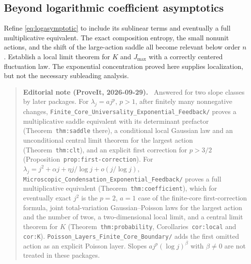 \documentclass[11pt,a4paper]{article}
\numberwithin{equation}{section}
\theoremstyle{definition}
\theoremstyle{remark}
\newenvironment{ednote}{\par\smallskip\begin{quote}\small\raggedright\textbf{Editorial note (ProveIt, 2026-09-29).}\ }{\end{quote}\smallskip}
\begin{document}
\subsection{Beyond logarithmic coefficient asymptotics}
Refine \eqref{eq:logasymptotic} to include its sublinear terms and eventually
a full multiplicative equivalent.  The exact composition entropy, the
small nonunit actions, and the shift of the large-action saddle all become
relevant below order $n$.  Establish a local limit theorem for $K$ and
$J_{\max}$ with a correctly centered fluctuation law.  The exponential
concentration proved here supplies localization, but not the necessary
subleading analysis.
\begin{ednote}
Answered for two slope classes by later packages. For $\lambda_j=aj^p$,
$p>1$, after finitely many nonnegative changes,
\nolinkurl{Finite_Core_Universality_Exponential_Feedback/} proves a
multiplicative saddle equivalent with its determinant prefactor
(Theorem~\texttt{thm:saddle} there), a conditional local Gaussian law and an
unconditional central limit theorem for the largest action
(Theorem~\texttt{thm:clt}), and an explicit first correction for $p>3/2$
(Proposition~\texttt{prop:first-correction}). For
$\lambda_j=j^2+\alpha j+\eta j/\log j+o(j/\log j)$,
\nolinkurl{Microscopic_Condensation_Exponential_Feedback/} proves a full
multiplicative equivalent (Theorem~\texttt{thm:coefficient}), which for eventually
exact $j^2$ is the $p=2$, $a=1$ case of the finite-core first-correction
formula, joint total-variation Gaussian--Poisson laws for the largest
action and the number of twos, a two-dimensional local limit, and a
central limit theorem for $K$ (Theorem~\texttt{thm:probability},
Corollaries~\texttt{cor:local} and \texttt{cor:K}).
\nolinkurl{Poisson_Layers_Finite_Core_Boundary/} adds the first omitted
action as an explicit Poisson layer. Slopes $aj^p(\log j)^\beta$ with
$\beta\ne0$ are not treated in these packages.
\end{ednote}
\end{document}
